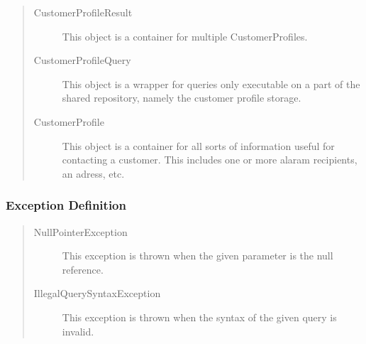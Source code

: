 \begin{quote}
	\begin{description}
		\item[CustomerProfileResult] This object is a container for multiple
		CustomerProfiles.
		\item[CustomerProfileQuery] This object is a wrapper for queries only executable on a
		part of the shared repository, namely the customer profile storage.
		\item[CustomerProfile] This object is a container for all sorts of information useful
		for contacting a customer. This includes one or more alaram recipients, an
		adress, etc.
	\end{description} 
\end{quote}

\subsubsection{Exception Definition} 

\begin{quote}
	\begin{description}
		\item[NullPointerException] This exception is thrown when the given parameter
		is the null reference.
		\item[IllegalQuerySyntaxException] This exception is thrown when the syntax of
		the given query is invalid.
	\end{description} 
\end{quote}